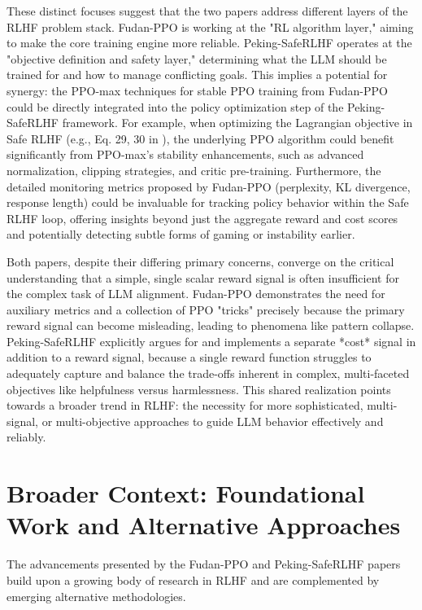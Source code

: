 \documentclass{article} %
\begin{document}
These distinct focuses suggest that the two papers address different layers of the RLHF problem stack. Fudan-PPO is working at the "RL algorithm layer," aiming to make the core training engine more reliable. Peking-SafeRLHF operates at the "objective definition and safety layer," determining what the LLM should be trained for and how to manage conflicting goals. This implies a potential for synergy: the PPO-max techniques for stable PPO training from Fudan-PPO could be directly integrated into the policy optimization step of the Peking-SafeRLHF framework. For example, when optimizing the Lagrangian objective in Safe RLHF (e.g., Eq. 29, 30 in \cite{Dai2023SafeRLHF}), the underlying PPO algorithm could benefit significantly from PPO-max's stability enhancements, such as advanced normalization, clipping strategies, and critic pre-training. Furthermore, the detailed monitoring metrics proposed by Fudan-PPO (perplexity, KL divergence, response length) could be invaluable for tracking policy behavior within the Safe RLHF loop, offering insights beyond just the aggregate reward and cost scores and potentially detecting subtle forms of gaming or instability earlier.

Both papers, despite their differing primary concerns, converge on the critical understanding that a simple, single scalar reward signal is often insufficient for the complex task of LLM alignment. Fudan-PPO demonstrates the need for auxiliary metrics and a collection of PPO "tricks" precisely because the primary reward signal can become misleading, leading to phenomena like pattern collapse. Peking-SafeRLHF explicitly argues for and implements a separate *cost* signal in addition to a reward signal, because a single reward function struggles to adequately capture and balance the trade-offs inherent in complex, multi-faceted objectives like helpfulness versus harmlessness. This shared realization points towards a broader trend in RLHF: the necessity for more sophisticated, multi-signal, or multi-objective approaches to guide LLM behavior effectively and reliably.

\section{Broader Context: Foundational Work and Alternative Approaches}
\label{sec:broader_context}

The advancements presented by the Fudan-PPO and Peking-SafeRLHF papers build upon a growing body of research in RLHF and are complemented by emerging alternative methodologies.
\end{document}
